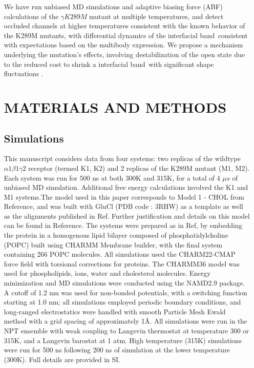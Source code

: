 \documentclass[journal=jacsat,manuscript=article]{achemso}
\newcommand{\fivering}{interfacial band~}
\newcommand{\triad}{pore oscillator~}
\newcommand{\triadns}{pore oscillator}
\begin{document}
We have run unbiased MD simulations and adaptive biasing force (ABF) calculations of the $\gamma K289M$ mutant at multiple temperatures, and detect occluded channels at higher temperatures consistent with the known behavior of the K289M mutants, with differential dynamics of the \fivering consistent with expectations based on the multibody expression.  We propose a mechanism underlying the mutation's effects, involving destabilization of the open state due to the reduced cost to shrink a \fivering with significant shape fluctuations .   %


\section*{MATERIALS AND METHODS}

\subsection*{Simulations}
This manuscript considers data from four systems: two replicas of the wildtype $\alpha1\beta1\gamma2$ receptor (termed K1, K2) and 2 replicas of the K289M mutant (M1, M2). Each system was run for 500 ns at both 300K and 315K, for a total of 4 $\mu s$ of unbiased MD simulation. Additional free energy calculations involved the K1 and M1 systems.The model used in this paper corresponds to Model 1 - CHOL from Reference\cite{Henin2014}, and was built with GluCl (PDB code : 3RHW) as a template as well as the alignments published in Ref\cite{Hibbs2011}. Further justification and details on this model can be found in Reference\cite{Henin2014}. The systems were prepared as in Ref\cite{Henin2014}, by embedding the protein in a homogenous lipid bilayer composed of phosphatidylcholine (POPC) built using CHARMM Membrane builder, with the final system containing 266 POPC molecules. %
All simulations used the CHARM22-CMAP\cite{MacKerell1998a} force field with torsional corrections for proteins. The CHARMM36 model\cite{Klauda2010,Pitman2004} was used for phospholipids, ions, water and cholesterol molecules. Energy minimization and MD simulations were conducted using the NAMD2.9 package\cite{Phillips2005a}.  A cutoff of 1.2 nm was used for non-bonded potentials, with a switching function starting at 1.0 nm; all simulations employed periodic boundary conditions, and long-ranged electrostatics were handled with smooth Particle Mesh Ewald method with a grid spacing of approximately 1\AA. All simulations were run in the NPT ensemble with weak coupling to Langevin thermostat at temperature 300 or 315K, and a Langevin barostat at 1 atm.   High temperature (315K) simulations were run for 500 ns following 200 ns of simulation at the lower temperature (300K).  Full details are provided in SI.
\end{document}
